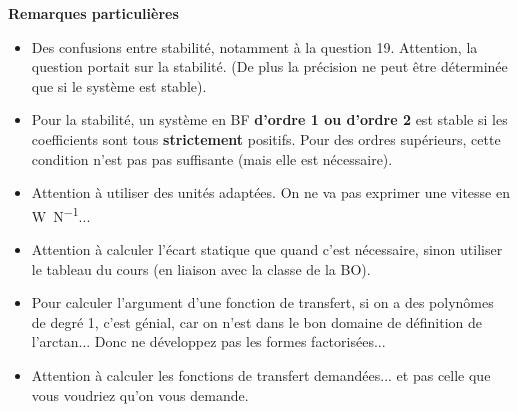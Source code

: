 \documentclass[10pt,fleqn]{article} %
\begin{document}
\textbf{Remarques particulières}
\begin{itemize}
\item Des confusions entre stabilité, notamment à la question 19. Attention, la question portait sur la stabilité. (De plus la précision ne peut être déterminée que si le système est stable).
\item Pour la stabilité, un système en BF \textbf{d'ordre 1 ou d'ordre 2} est stable si les coefficients sont tous \textbf{strictement} positifs. Pour des ordres supérieurs, cette condition n'est pas pas suffisante (mais elle est nécessaire).
\item Attention à utiliser des unités adaptées. On ne va pas exprimer une vitesse en \si{W.N^{-1}}...
\item Attention à calculer l'écart statique que quand c'est nécessaire, sinon utiliser le tableau du cours (en liaison avec la classe de la BO).
\item Pour calculer l'argument d'une fonction de transfert, si on a des polynômes de degré 1, c'est génial, car on n'est dans le bon domaine de définition de l'arctan... Donc ne développez pas les formes factorisées...
\item Attention à calculer les fonctions de transfert demandées... et pas celle que vous voudriez qu'on vous demande.  
\end{itemize}





%
\end{document}

